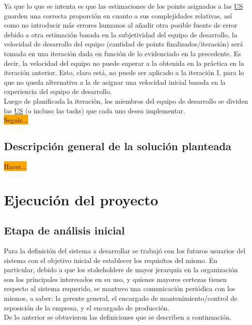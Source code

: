 \documentclass[a4paper, 12pt,twoside]{report}  %
\numberwithin{equation}{subsection} %
\begin{document}
\indent Ya que lo que se intenta es que las estimaciones de los points asignados a las \hyperlink{US}{US} guarden una correcta proporción en cuanto a sus complejidades relativas, así como no introducir más errores humanos al añadir otra posible fuente de error debido a otra estimación basada en la subjetividad del equipo de desarrollo, la velocidad de desarrollo del equipo (cantidad de points finalizados/iteración) será tomada en una iteración dada en función de lo evidenciado en la precedente. Es decir, la velocidad del equipo no puede superar a la obtenida en la práctica en la iteración anterior. Esto, claro está, no puede ser aplicado a la iteración I, para lo que no queda alternativa a la de asignar una velocidad inicial basada en la experiencia del equipo de desarrollo.\\
\indent Luego de planificada la iteración, los miembros del equipo de desarrollo se dividen las \hyperlink{US}{US} (o incluso las tasks) que cada uno desea implementar.\\
\indent\colorbox{orange}{Seguir...}

\section{Descripción general de la solución planteada}
\indent\colorbox{orange}{Hacer...}

\chapter{Ejecución del proyecto}
\section{Etapa de análisis inicial}

Para la definición del sistema a desarrollar se trabajó con los futuros usuarios del sistema con el objetivo inicial de establecer los requisitos del mismo. En particular, debido a que los stakeholders de mayor jerarquía en la organización son los principales interesados en su uso, y quienes mayores certezas tienen respecto al sistema requerido, se mantuvo una comunicación periódica con los mismos, a saber: la gerente general, el encargado de mantenimiento/control de reposición de la empresa, y el encargado de producción.\\
\indent De lo anterior se obtuvieron las definiciones que se describen a continuación.
\end{document}
